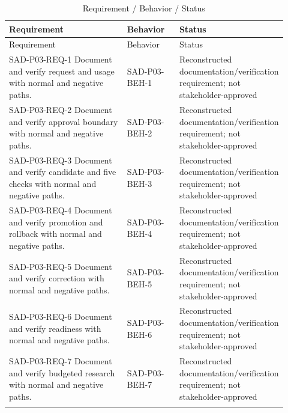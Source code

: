 \documentclass[10pt,letterpaper]{article}
\begin{document}
\begin{longtable}{@{}>{\raggedright\arraybackslash}p{0.44\linewidth}>{\raggedright\arraybackslash}p{0.19\linewidth}>{\raggedright\arraybackslash}p{0.29\linewidth}@{}}
\caption{Requirement / Behavior / Status}\\
\toprule Requirement & Behavior & Status\\\midrule\endfirsthead
\toprule Requirement & Behavior & Status\\\midrule\endhead
SAD-P03-REQ-1 Document and verify request and usage with normal and negative paths. & SAD-P03-BEH-1 & Reconstructed documentation/verification requirement; not stakeholder-approved\\\addlinespace
SAD-P03-REQ-2 Document and verify approval boundary with normal and negative paths. & SAD-P03-BEH-2 & Reconstructed documentation/verification requirement; not stakeholder-approved\\\addlinespace
SAD-P03-REQ-3 Document and verify candidate and five checks with normal and negative paths. & SAD-P03-BEH-3 & Reconstructed documentation/verification requirement; not stakeholder-approved\\\addlinespace
SAD-P03-REQ-4 Document and verify promotion and rollback with normal and negative paths. & SAD-P03-BEH-4 & Reconstructed documentation/verification requirement; not stakeholder-approved\\\addlinespace
SAD-P03-REQ-5 Document and verify correction with normal and negative paths. & SAD-P03-BEH-5 & Reconstructed documentation/verification requirement; not stakeholder-approved\\\addlinespace
SAD-P03-REQ-6 Document and verify readiness with normal and negative paths. & SAD-P03-BEH-6 & Reconstructed documentation/verification requirement; not stakeholder-approved\\\addlinespace
SAD-P03-REQ-7 Document and verify budgeted research with normal and negative paths. & SAD-P03-BEH-7 & Reconstructed documentation/verification requirement; not stakeholder-approved\\\addlinespace
\bottomrule\end{longtable}
\end{document}
